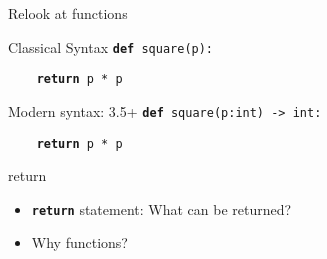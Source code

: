 \documentclass[14pt]{beamer}
\begin{document}
\begin{frame}{Relook at functions}
    \begin{block}{Classical Syntax}
      \texttt{\textbf{def} square(p):}
      
      \texttt{~~~~\textbf{return} p * p}
    \end{block}
    \pause
    \begin{block}{Modern syntax: 3.5+}
      \texttt{\textbf{def} square(p:int) -> int:}

      \texttt{~~~~\textbf{return} p * p}
    \end{block}
  \end{frame}
  
\begin{frame}{return}    
  \begin{itemize}
  \item	\textbf{\texttt{return}} statement: What can be returned?
    \pause
  \item Why functions?
  \end{itemize}
\end{frame}
\end{document}

